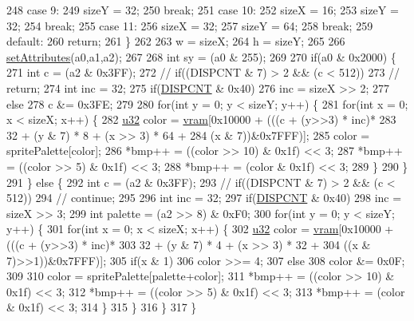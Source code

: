 \begin{DoxyCode}
248   \textcolor{keywordflow}{case} 9:
249     sizeY = 32;
250     \textcolor{keywordflow}{break};
251   \textcolor{keywordflow}{case} 10:
252     sizeX = 16;
253     sizeY = 32;
254     \textcolor{keywordflow}{break};
255   \textcolor{keywordflow}{case} 11:
256     sizeX = 32;
257     sizeY = 64;
258     \textcolor{keywordflow}{break};
259   \textcolor{keywordflow}{default}:
260     \textcolor{keywordflow}{return};
261   \}
262 
263   w = sizeX;
264   h = sizeY;
265 
266   \mbox{\hyperlink{class_oam_view_aafceb25b05d3ff2eacffa1a53308ee1d}{setAttributes}}(a0,a1,a2);
267   
268   \textcolor{keywordtype}{int} sy = (a0 & 255);
269   
270   \textcolor{keywordflow}{if}(a0 & 0x2000) \{
271     \textcolor{keywordtype}{int} c = (a2 & 0x3FF);
272     \textcolor{comment}{//          if((DISPCNT & 7) > 2 && (c < 512))}
273     \textcolor{comment}{//            return;}
274     \textcolor{keywordtype}{int} inc = 32;
275     \textcolor{keywordflow}{if}(\mbox{\hyperlink{_globals_8cpp_a843ca20ea4281609edb7d32392e31de8}{DISPCNT}} & 0x40)
276       inc = sizeX >> 2;
277     \textcolor{keywordflow}{else}
278       c &= 0x3FE;
279     
280     \textcolor{keywordflow}{for}(\textcolor{keywordtype}{int} y = 0; y < sizeY; y++) \{
281       \textcolor{keywordflow}{for}(\textcolor{keywordtype}{int} x = 0; x < sizeX; x++) \{
282         \mbox{\hyperlink{_system_8h_a10e94b422ef0c20dcdec20d31a1f5049}{u32}} color = \mbox{\hyperlink{_globals_8cpp_a983f8cd19ae66ea98e180c2e13bee5b9}{vram}}[0x10000 + (((c + (y>>3) * inc)*
283                                      32 + (y & 7) * 8 + (x >> 3) * 64 +
284                                      (x & 7))&0x7FFF)];
285         color = spritePalette[color];
286         *bmp++ = ((color >> 10) & 0x1f) << 3;
287         *bmp++ = ((color >> 5) & 0x1f) << 3;
288         *bmp++ = (color & 0x1f) << 3;
289       \}
290     \}
291   \} \textcolor{keywordflow}{else} \{
292     \textcolor{keywordtype}{int} c = (a2 & 0x3FF);
293     \textcolor{comment}{//      if((DISPCNT & 7) > 2 && (c < 512))}
294     \textcolor{comment}{//          continue;}
295     
296     \textcolor{keywordtype}{int} inc = 32;
297     \textcolor{keywordflow}{if}(\mbox{\hyperlink{_globals_8cpp_a843ca20ea4281609edb7d32392e31de8}{DISPCNT}} & 0x40)
298       inc = sizeX >> 3;
299     \textcolor{keywordtype}{int} palette = (a2 >> 8) & 0xF0;
300     \textcolor{keywordflow}{for}(\textcolor{keywordtype}{int} y = 0; y < sizeY; y++) \{
301       \textcolor{keywordflow}{for}(\textcolor{keywordtype}{int} x = 0; x < sizeX; x++) \{
302         \mbox{\hyperlink{_system_8h_a10e94b422ef0c20dcdec20d31a1f5049}{u32}} color = \mbox{\hyperlink{_globals_8cpp_a983f8cd19ae66ea98e180c2e13bee5b9}{vram}}[0x10000 + (((c + (y>>3) * inc)*
303                                      32 + (y & 7) * 4 + (x >> 3) * 32 +
304                                      ((x & 7)>>1))&0x7FFF)];
305         \textcolor{keywordflow}{if}(x & 1)
306           color >>= 4;
307         \textcolor{keywordflow}{else}
308           color &= 0x0F;
309         
310         color = spritePalette[palette+color];
311         *bmp++ = ((color >> 10) & 0x1f) << 3;
312         *bmp++ = ((color >> 5) & 0x1f) << 3;
313         *bmp++ = (color & 0x1f) << 3;            
314       \}
315     \}
316   \}
317 \}
\end{DoxyCode}
